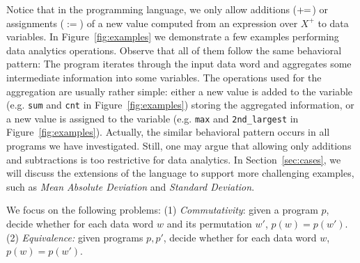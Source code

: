 

Notice that in the programming language, we only allow additions ($+\!\!=$) or assignments ($:=$) of a new value computed from an expression over $X^+$ to data variables. 
In Figure~\ref{fig:examples} we demonstrate a few examples performing data analytics operations. Observe that all of them follow the same behavioral pattern: The program iterates through the input data word and aggregates some intermediate information into some variables. The operations used for the aggregation are usually rather simple: either a new value is added to the variable (e.g. \texttt{sum} and \texttt{cnt} in Figure~\ref{fig:examples}) storing the aggregated information, or a new value is assigned to the variable (e.g. \texttt{max} and \texttt{2nd\_largest} in Figure~\ref{fig:examples}). Actually, the similar behavioral pattern occurs in all programs we have investigated.
Still, one may argue that allowing only additions and subtractions is too restrictive for data analytics. 
In Section~\ref{sec:cases}, we will discuss the extensions of the language to support more challenging examples, such as \emph{Mean Absolute Deviation} and \emph{Standard Deviation}.


 

We focus on the following problems: (1) \emph{Commutativity}: given a program $p$, decide whether for each data word $w$ and its permutation $w'$, $p(w) = p(w')$. (2) \emph{Equivalence:} given programs $p,p'$, decide whether for each data word $w$, $p(w)=p(w')$.





